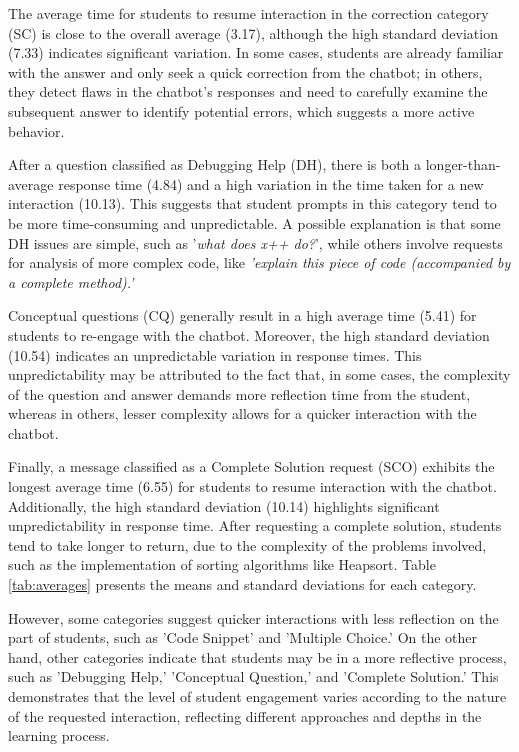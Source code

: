 \documentclass[a4paper,twoside]{article}
\begin{document}
The average time for students to resume interaction in the correction category
(SC) is close to the overall average (3.17), although the high standard
deviation (7.33) indicates significant variation. In some cases, students are
already familiar with the answer and only seek a quick correction from the chatbot;
in others, they detect flaws in the chatbot's responses and need to carefully
examine the subsequent answer to identify potential errors, which suggests a
more active behavior.

After a question classified as Debugging Help (DH), there is both a
longer-than-average response time (4.84) and a high variation in the time taken
for a new interaction (10.13). This suggests that student prompts in this
category tend to be more time-consuming and unpredictable. A possible
explanation is that some DH issues are simple, such as '\textit{what does x++ do?}',
while others involve requests for analysis of more complex code, like
\textit{'explain this piece of code (accompanied by a complete method).'}

Conceptual questions (CQ) generally result in a high average time (5.41) for
students to re-engage with the chatbot. Moreover, the high standard deviation
(10.54) indicates an unpredictable variation in response times. This
unpredictability may be attributed to the fact that, in some cases, the
complexity of the question and answer demands more reflection time from the
student, whereas in others, lesser complexity allows for a quicker interaction
with the chatbot.

Finally, a message classified as a Complete Solution request (SCO) exhibits the
longest average time (6.55) for students to resume interaction with the chatbot.
Additionally, the high standard deviation (10.14) highlights significant
unpredictability in response time. After requesting a complete solution,
students tend to take longer to return, due to the complexity of the problems
involved, such as the implementation of sorting algorithms like Heapsort. Table
\ref{tab:averages} presents the means and standard deviations for each
category.

However, some categories suggest quicker interactions with less reflection on
the part of students, such as 'Code Snippet' and 'Multiple Choice.' On the other
hand, other categories indicate that students may be in a more reflective
process, such as 'Debugging Help,' 'Conceptual Question,' and 'Complete
Solution.' This demonstrates that the level of student engagement varies
according to the nature of the requested interaction, reflecting different
approaches and depths in the learning process.
\end{document}
